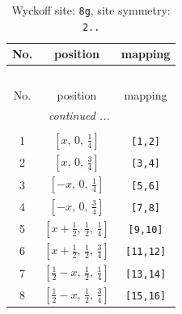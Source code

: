\documentclass[fleqn,8pt]{jsarticle}
\begin{document}
\renewcommand{\arraystretch}{1.2}
\begin{longtable}{ccc}
\caption{Wyckoff site: {\tt 8g}, site symmetry: {\tt 2..}}
 \\
 \hline \hline
No. & position & mapping \\ \hline \endfirsthead

\multicolumn{2}{l}{\tablename\ \thetable{}} \\
 \hline \hline
No. & position & mapping \\ \hline \endhead

 \hline \hline
\multicolumn{2}{r}{\footnotesize\it continued ...} \\ \endfoot

 \hline \hline
\multicolumn{2}{r}{} \\ \endlastfoot

1 & $\left[ x,\, 0,\, \frac{1}{4} \right]$ & {\tt [1,2]} \\ \hline
2 & $\left[ x,\, 0,\, \frac{3}{4} \right]$ & {\tt [3,4]} \\ \hline
3 & $\left[ - x,\, 0,\, \frac{1}{4} \right]$ & {\tt [5,6]} \\ \hline
4 & $\left[ - x,\, 0,\, \frac{3}{4} \right]$ & {\tt [7,8]} \\ \hline
5 & $\left[ x + \frac{1}{2},\, \frac{1}{2},\, \frac{1}{4} \right]$ & {\tt [9,10]} \\ \hline
6 & $\left[ x + \frac{1}{2},\, \frac{1}{2},\, \frac{3}{4} \right]$ & {\tt [11,12]} \\ \hline
7 & $\left[ \frac{1}{2} - x,\, \frac{1}{2},\, \frac{1}{4} \right]$ & {\tt [13,14]} \\ \hline
8 & $\left[ \frac{1}{2} - x,\, \frac{1}{2},\, \frac{3}{4} \right]$ & {\tt [15,16]} \\
\end{longtable}
\renewcommand{\arraystretch}{1.2}
\end{document}
